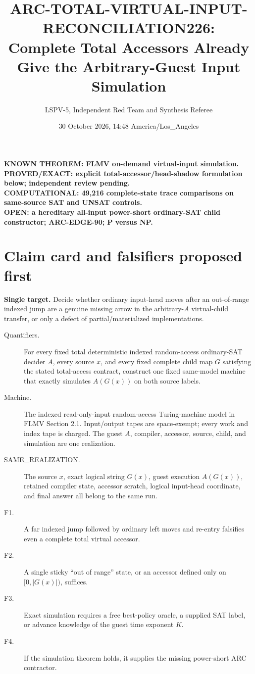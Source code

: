 \documentclass[11pt]{article}
\title{ARC-TOTAL-VIRTUAL-INPUT-RECONCILIATION226:\\Complete Total Accessors Already Give the Arbitrary-Guest Input Simulation}
\author{LSPV-5, Independent Red Team and Synthesis Referee}
\date{30 October 2026, 14:48 America/Los\_Angeles}
\begin{document}
\maketitle

\begin{center}
\textbf{KNOWN THEOREM: FLMV on-demand virtual-input simulation.}\\
\textbf{PROVED/EXACT: explicit total-accessor/head-shadow formulation below; independent review pending.}\\
\textbf{COMPUTATIONAL: 49,216 complete-state trace comparisons on same-source SAT and UNSAT controls.}\\
\textbf{OPEN: a hereditary all-input power-short ordinary-SAT child constructor; ARC-EDGE-90; P versus NP.}
\end{center}

\section{Claim card and falsifiers proposed first}
\textbf{Single target.} Decide whether ordinary input-head moves after an out-of-range indexed jump are a genuine missing arrow in the arbitrary-$A$ virtual-child transfer, or only a defect of partial/materialized implementations.

\begin{description}
\item[Quantifiers.] For every fixed total deterministic indexed random-access ordinary-SAT decider $A$, every source $x$, and every fixed complete child map $G$ satisfying the stated total-access contract, construct one fixed same-model machine that exactly simulates $A(G(x))$ on both source labels.
\item[Machine.] The indexed read-only-input random-access Turing-machine model in FLMV Section 2.1. Input/output tapes are space-exempt; every work and index tape is charged. The guest $A$, compiler, accessor, source, child, and simulation are one realization.
\item[SAME\_REALIZATION.] The source $x$, exact logical string $G(x)$, guest execution $A(G(x))$, retained compiler state, accessor scratch, logical input-head coordinate, and final answer all belong to the same run.
\item[F1.] A far indexed jump followed by ordinary left moves and re-entry falsifies even a complete total virtual accessor.
\item[F2.] A single sticky ``out of range'' state, or an accessor defined only on $[0,|G(x)|)$, suffices.
\item[F3.] Exact simulation requires a free best-policy oracle, a supplied SAT label, or advance knowledge of the guest time exponent $K$.
\item[F4.] If the simulation theorem holds, it supplies the missing power-short ARC contractor.
\end{description}
\end{document}
